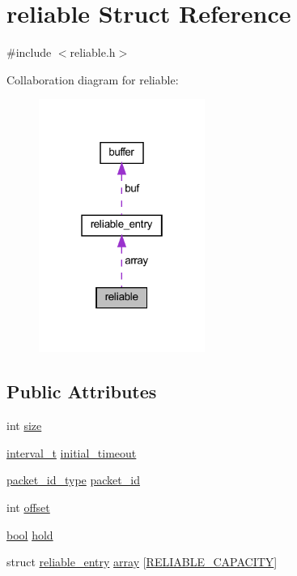 \hypertarget{structreliable}{}\section{reliable Struct Reference}
\label{structreliable}


{\ttfamily \#include $<$reliable.\+h$>$}



Collaboration diagram for reliable\+:
\nopagebreak
\begin{figure}[H]
\begin{center}
\leavevmode
\includegraphics[width=154pt]{structreliable__coll__graph}
\end{center}
\end{figure}
\subsection*{Public Attributes}
\begin{DoxyCompactItemize}
\item 
int \hyperlink{structreliable_a410412e1f605ae7a0fe5b3d4db8de35f}{size}
\item 
\hyperlink{common_8h_a3d8621f960ada51a5ad9ff181730481a}{interval\+\_\+t} \hyperlink{structreliable_a7e6d00ae7a9b6f3350ea40878c66e69f}{initial\+\_\+timeout}
\item 
\hyperlink{packet__id_8h_a345f753b1c6ea20d24409e769aadb7e6}{packet\+\_\+id\+\_\+type} \hyperlink{structreliable_a565cf23e829f768c537aaf4a99d5d72f}{packet\+\_\+id}
\item 
int \hyperlink{structreliable_af881f7757244b075580879431304cf8a}{offset}
\item 
\hyperlink{automatic_8c_abb452686968e48b67397da5f97445f5b}{bool} \hyperlink{structreliable_a2be86afe4085c4dd783192abeacf0203}{hold}
\item 
struct \hyperlink{structreliable__entry}{reliable\+\_\+entry} \hyperlink{structreliable_a1e75059a686e2625f46ca7764e90052e}{array} \mbox{[}\hyperlink{group__reliable_gaa626a13dc31bf131a92548b9b2810cba}{R\+E\+L\+I\+A\+B\+L\+E\+\_\+\+C\+A\+P\+A\+C\+I\+T\+Y}\mbox{]}
\end{DoxyCompactItemize}


